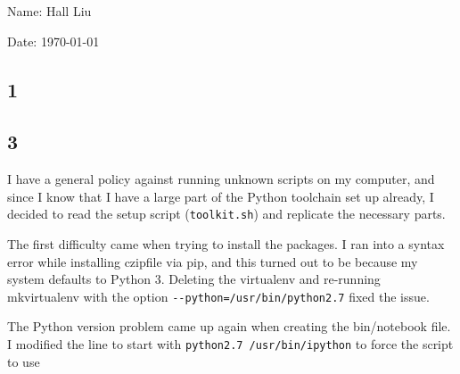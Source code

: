 \documentclass{article}
\begin{document}
Name: Hall Liu

Date: \today 
\vspace{1.5cm}

\subsection*{1}

\subsection*{3}
I have a general policy against running unknown scripts on my computer, and since I know that I have a large part of the Python toolchain set up already, I decided to read the setup script (\verb|toolkit.sh|) and replicate the necessary parts. 

The first difficulty came when trying to install the packages. I ran into a syntax error while installing czipfile via pip, and this turned out to be because my system defaults to Python 3. Deleting the virtualenv and re-running mkvirtualenv with the option \verb|--python=/usr/bin/python2.7| fixed the issue.

The Python version problem came up again when creating the bin/notebook file. I modified the line to start with \verb|python2.7 /usr/bin/ipython| to force the script to use 
\end{document}

